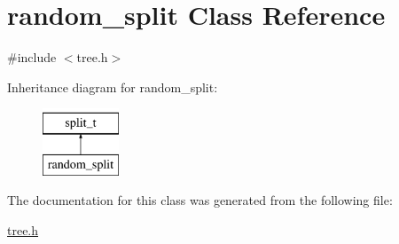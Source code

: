 \hypertarget{classrandom__split}{\section{random\+\_\+split Class Reference}
\label{classrandom__split}
}


{\ttfamily \#include $<$tree.\+h$>$}

Inheritance diagram for random\+\_\+split\+:\begin{figure}[H]
\begin{center}
\leavevmode
\includegraphics[height=2.000000cm]{classrandom__split}
\end{center}
\end{figure}


The documentation for this class was generated from the following file\+:\begin{DoxyCompactItemize}
\item 
\hyperlink{tree_8h}{tree.\+h}\end{DoxyCompactItemize}
